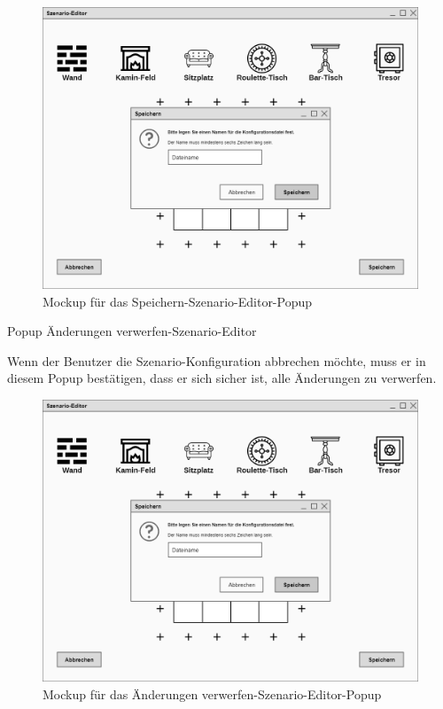 \begin{figure}[H]
  \centering
  \includegraphics[width=\textwidth]{Meilenstein03/Speichern-Szenario-Editor_Mockup.png}
  \caption{Mockup für das Speichern-Szenario-Editor-Popup}
\end{figure}

Popup \glqq{}Änderungen verwerfen-Szenario-Editor\grqq{}

Wenn der Benutzer die Szenario-Konfiguration abbrechen möchte, muss er in diesem Popup bestätigen, dass er sich sicher ist, alle Änderungen zu verwerfen.

\begin{figure}[H]
  \centering
  \includegraphics[width=\textwidth]{Meilenstein03/Speichern-Szenario-Editor_Mockup.png}
  \caption{Mockup für das Änderungen verwerfen-Szenario-Editor-Popup}
\end{figure}


